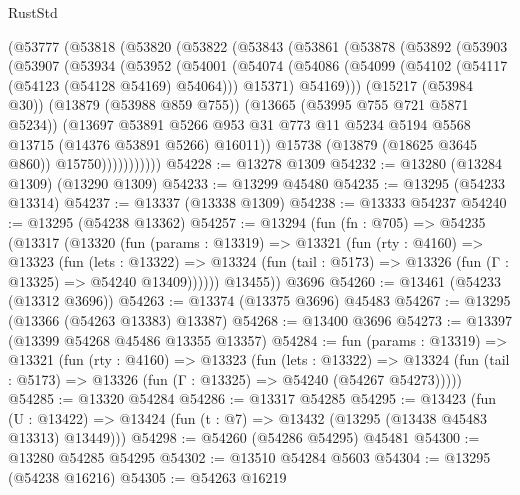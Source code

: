\begin{lexlean}{RustStd}
\begin{coremodule}
    (@53777
      (@53818
        (@53820
          (@53822
            (@53843
              (@53861
                (@53878
                  (@53892
                    (@53903
                      (@53907
                        (@53934
                          (@53952
                            (@54001
                              (@54074
                                (@54086
                                  (@54099 (@54102 (@54117 (@54123 (@54128 @54169) @54064))) @15371)
                                  @54169)))
                            (@15217 (@53984 @30))
                            (@13879 (@53988 @859 @755))
                            (@13665 (@53995 @755 @721 @5871 @5234))
                            (@13697
                              @53891
                              @5266
                              @953
                              @31
                              @773
                              @11
                              @5234
                              @5194
                              @5568
                              @13715
                              (@14376 @53891 @5266)
                              @16011))
                          @15738
                          (@13879 (@18625 @3645 @860))
                          @15750)))))))))))
@54228 := @13278 @1309
@54232 := @13280 (@13284 @1309) (@13290 @1309)
@54233 := @13299 @45480
@54235 := @13295 (@54233 @13314)
@54237 := @13337 (@13338 @1309)
@54238 := @13333 @54237
@54240 := @13295 (@54238 @13362)
@54257 := @13294
    (fun (fn : @705) =>
    @54235
      (@13317
        (@13320
          (fun (params : @13319) =>
          @13321
            (fun (rty : @4160) =>
            @13323
              (fun (lets : @13322) =>
              @13324 (fun (tail : @5173) => @13326 (fun (Γ : @13325) => @54240 @13409))))))
        @13455))
    @3696
@54260 := @13461 (@54233 (@13312 @3696))
@54263 := @13374 (@13375 @3696) @45483
@54267 := @13295 (@13366 (@54263 @13383) @13387)
@54268 := @13400 @3696
@54273 := @13397 (@13399 @54268 @45486 @13355 @13357)
@54284 := fun (params : @13319) =>
  @13321
    (fun (rty : @4160) =>
    @13323
      (fun (lets : @13322) =>
      @13324 (fun (tail : @5173) => @13326 (fun (Γ : @13325) => @54240 (@54267 @54273)))))
@54285 := @13320 @54284
@54286 := @13317 @54285
@54295 := @13423
    (fun (U : @13422) => @13424 (fun (t : @7) => @13432 (@13295 (@13438 @45483 @13313) @13449)))
@54298 := @54260 (@54286 @54295) @45481
@54300 := @13280 @54285 @54295
@54302 := @13510 @54284 @5603
@54304 := @13295 (@54238 @16216)
@54305 := @54263 @16219

\end{coremodule}
\end{lexlean}
